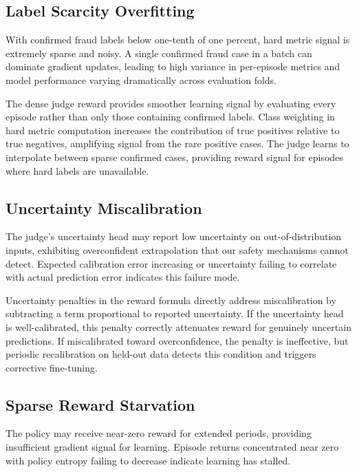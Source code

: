 \documentclass[11pt,a4paper]{article}
\begin{document}
\subsection{Label Scarcity Overfitting}

With confirmed fraud labels below one-tenth of one percent, hard metric signal is extremely sparse and noisy. A single confirmed fraud case in a batch can dominate gradient updates, leading to high variance in per-episode metrics and model performance varying dramatically across evaluation folds.

The dense judge reward provides smoother learning signal by evaluating every episode rather than only those containing confirmed labels. Class weighting in hard metric computation increases the contribution of true positives relative to true negatives, amplifying signal from the rare positive cases. The judge learns to interpolate between sparse confirmed cases, providing reward signal for episodes where hard labels are unavailable.

\subsection{Uncertainty Miscalibration}

The judge's uncertainty head may report low uncertainty on out-of-distribution inputs, exhibiting overconfident extrapolation that our safety mechanisms cannot detect. Expected calibration error increasing or uncertainty failing to correlate with actual prediction error indicates this failure mode.

Uncertainty penalties in the reward formula directly address miscalibration by subtracting a term proportional to reported uncertainty. If the uncertainty head is well-calibrated, this penalty correctly attenuates reward for genuinely uncertain predictions. If miscalibrated toward overconfidence, the penalty is ineffective, but periodic recalibration on held-out data detects this condition and triggers corrective fine-tuning.

\subsection{Sparse Reward Starvation}

The policy may receive near-zero reward for extended periods, providing insufficient gradient signal for learning. Episode returns concentrated near zero with policy entropy failing to decrease indicate learning has stalled.
\end{document}
